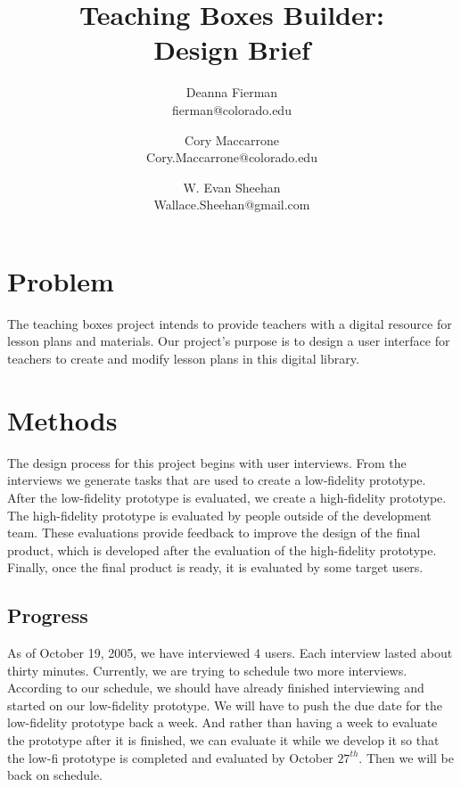 \documentclass[12pt,titlepage]{article}
\title{Teaching Boxes Builder: \\ Design Brief}
\author{Deanna Fierman  \\ \small{fierman@colorado.edu} \and
        Cory Maccarrone \\ \small{Cory.Maccarrone@colorado.edu} \and
		W. Evan Sheehan \\ \small{Wallace.Sheehan@gmail.com}}
\newcommand{\blankpage}{\hfill\thispagestyle{empty}\pagebreak\addtocounter{page}{-1}}
\begin{document}
\maketitle

\blankpage

\tableofcontents
\cfoot{\hrule \thepage}
\pagebreak

\blankpage


\section{Problem}
The teaching boxes project intends to provide teachers with a digital resource
for lesson plans and materials. Our project's purpose is to design a user
interface for teachers to create and modify lesson plans in this digital
library.

\section{Methods}
The design process for this project begins with user interviews. From the
interviews we generate tasks that are used to create a low-fidelity prototype.
After the low-fidelity prototype is evaluated, we create a high-fidelity
prototype. The high-fidelity prototype is evaluated by people outside of
the development team. These evaluations provide feedback to improve the design
of the final product, which is developed after the evaluation of the
high-fidelity prototype. Finally, once the final product is ready, it is
evaluated by some target users.

\subsection{Progress}
As of October 19, 2005, we have interviewed 4 users. Each interview lasted about
thirty minutes.  Currently, we are trying to schedule two more interviews.
According to our schedule, we should have already finished interviewing and
started on our low-fidelity prototype. We will have to push the due date for the
low-fidelity prototype back a week. And rather than having a week to evaluate
the prototype after it is finished, we can evaluate it while we develop it so
that the low-fi prototype is completed and evaluated by October $27^{th}$. Then
we will be back on schedule.
\end{document}
